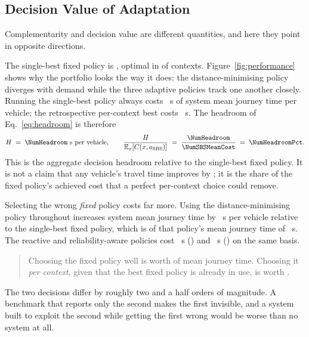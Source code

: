 \subsection{Decision Value of Adaptation}

Complementarity and decision value are different quantities, and here they point
in opposite directions.

The single-best fixed policy is \NumGlobalSBS{}, optimal in \NumSBSOptimalPct{}
of contexts. Figure~\ref{fig:performance} shows why the portfolio looks the way
it does: the distance-minimising policy diverges with demand while the three
adaptive policies track one another closely. Running the single-best policy
always costs \NumSBSMeanCost~s of system mean journey time per vehicle; the
retrospective per-context best costs \NumCostVBS~s. The headroom of
Eq.~\ref{eq:headroom} is therefore
\begin{equation}
H \;=\; \NumHeadroom\ \text{s per vehicle},
\qquad
\frac{H}{\mathbb{E}_x[C(x,a_{\mathrm{SBS}})]}
\;=\; \frac{\NumHeadroom}{\NumSBSMeanCost} \;=\; \NumHeadroomPct .
\end{equation}
This is the aggregate decision headroom relative to the single-best fixed
policy. It is not a claim that any vehicle's travel time improves by
\NumHeadroomPct{}; it is the share of the fixed policy's achieved cost that a
perfect per-context choice could remove.

Selecting the wrong \emph{fixed} policy costs far more. Using the
distance-minimising policy throughout increases system mean journey time by
\NumFixedPenAbsPOne~s per vehicle relative to the single-best fixed policy,
which is \NumFixedPenPctAbsPOne{} of that policy's mean journey time of
\NumSBSMeanCost~s. The reactive and reliability-aware policies cost
\NumFixedPenAbsPTwo~s (\NumFixedPenPctAbsPTwo{}) and \NumFixedPenAbsPFour~s
(\NumFixedPenPctAbsPFour{}) on the same basis.

\begin{quote}
Choosing the fixed policy well is worth \NumFixedPenPctAbsPOne{} of mean journey
time. Choosing it \emph{per context}, given that the best fixed policy is
already in use, is worth \NumHeadroomPct{}.
\end{quote}

The two decisions differ by roughly two and a half orders of magnitude. A
benchmark that reports only the second makes the first invisible, and a system
built to exploit the second while getting the first wrong would be worse than
no system at all.

